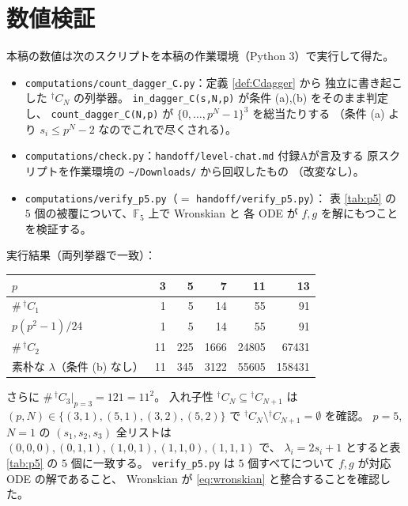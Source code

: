\documentclass[a4paper,11pt]{ltjsarticle}
\theoremstyle{plain}
\theoremstyle{definition}
\newcommand{\bbF}{\mathbb{F}}
\begin{document}
\section{数値検証}\label{app:num}

本稿の数値は次のスクリプトを本稿の作業環境（Python 3）で実行して得た。

\begin{itemize}[leftmargin=1.8em]
\item \texttt{computations/count\_dagger\_C.py}：定義 \ref{def:Cdagger} から
      独立に書き起こした ${}^{\dagger}C_N$ の列挙器。
      \texttt{in\_dagger\_C(s,N,p)} が条件 (a),(b) をそのまま判定し、
      \texttt{count\_dagger\_C(N,p)} が $\{0,\dots,p^N-1\}^3$ を総当たりする
      （条件 (a) より $s_i\le p^N-2$ なのでこれで尽くされる）。
\item \texttt{computations/check.py}：\texttt{handoff/level-chat.md} 付録Aが言及する
      原スクリプトを作業環境の \texttt{\~{}/Downloads/} から回収したもの
      （改変なし）。
\item \texttt{computations/verify\_p5.py}（$=$ \texttt{handoff/verify\_p5.py}）：
      表 \ref{tab:p5} の $5$ 個の被覆について、$\bbF_5$ 上で Wronskian と
      各 ODE が $f,g$ を解にもつことを検証する。
\end{itemize}

\noindent 実行結果（両列挙器で一致）：

\begin{center}
\begin{tabular}{lrrrrr}
\toprule
$p$ & 3 & 5 & 7 & 11 & 13\\
\midrule
$\#\,{}^{\dagger}C_1$ & 1 & 5 & 14 & 55 & 91\\
$p(p^2-1)/24$ & 1 & 5 & 14 & 55 & 91\\
$\#\,{}^{\dagger}C_2$ & 11 & 225 & 1666 & 24805 & 67431\\
素朴な $\lambda$（条件 (b) なし）& 11 & 345 & 3122 & 55605 & 158431\\
\bottomrule
\end{tabular}
\end{center}

\noindent さらに $\#\,{}^{\dagger}C_3\big|_{p=3}=121=11^2$。
入れ子性 ${}^{\dagger}C_N\subseteq{}^{\dagger}C_{N+1}$ は
$(p,N)\in\{(3,1),(5,1),(3,2),(5,2)\}$ で
${}^{\dagger}C_N\setminus{}^{\dagger}C_{N+1}=\emptyset$ を確認。
$p=5$, $N=1$ の $(s_1,s_2,s_3)$ 全リストは
$(0,0,0),(0,1,1),(1,0,1),(1,1,0),(1,1,1)$ で、
$\lambda_i=2s_i+1$ とすると表 \ref{tab:p5} の $5$ 個に一致する。
\texttt{verify\_p5.py} は $5$ 個すべてについて $f,g$ が対応 ODE の解であること、
Wronskian が \eqref{eq:wronskian} と整合することを確認した。
\end{document}
